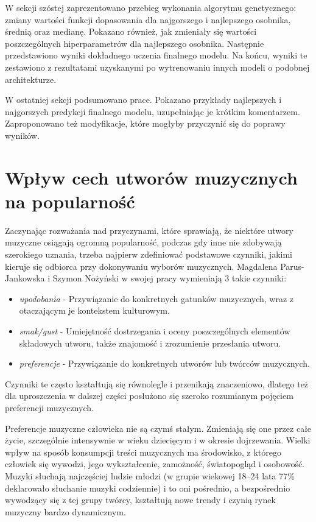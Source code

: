 \documentclass[a4paper,11pt]{article}
\begin{document}
    \bigskip

    W sekcji szóstej zaprezentowano przebieg wykonania algorytmu genetycznego: zmiany wartości funkcji dopasowania dla najgorszego i najlepszego osobnika, średnią oraz medianę. Pokazano również, jak zmieniały się wartości poszczególnych hiperparametrów dla najlepszego osobnika. Następnie przedstawiono wyniki dokładnego uczenia finalnego modelu. Na końcu, wyniki te zestawiono z rezultatami uzyskanymi po wytrenowaniu innych modeli o podobnej architekturze.

    \bigskip

    W ostatniej sekcji podsumowano prace. Pokazano przykłady najlepszych i najgorszych predykcji finalnego modelu, uzupełniając je krótkim komentarzem. Zaproponowano też modyfikacje, które mogłyby przyczynić się do poprawy wyników.

    \newpage


    \section{Wpływ cech utworów muzycznych na popularność}

    Zaczynając rozważania nad przyczynami, które sprawiają, że niektóre utwory muzyczne osiągają ogromną popularność, podczas gdy inne nie zdobywają szerokiego uznania, trzeba najpierw zdefiniować podstawowe czynniki, jakimi kieruje się odbiorca przy dokonywaniu wyborów muzycznych. Magdalena Parus-Jankowska i Szymon Nożyński w swojej pracy\cite{PreferencjeMuzyczneWCzasachSteamingu2020} wymieniają 3 takie czynniki:
    \begin{itemize}
        \item \textit{upodobania} - Przywiązanie do konkretnych gatunków muzycznych, wraz z otaczającym je kontekstem kulturowym.
        \item \textit{smak/gust} - Umiejętność dostrzegania i oceny poszczególnych elementów składowych utworu, także znajomość i zrozumienie przesłania utworu.
        \item \textit{preferencje} - Przywiązanie do konkretnych utworów lub twórców muzycznych.
    \end{itemize}
    \smallskip
    Czynniki te często kształtują się równolegle i przenikają znaczeniowo, dlatego też dla uproszczenia w dalszej części posłużono się szeroko rozumianym pojęciem preferencji muzycznych.

    \bigskip

    Preferencje muzyczne człowieka nie są czymś stałym. Zmieniają się one przez całe życie, szczególnie intensywnie w wieku dziecięcym i w okresie dojrzewania\cite{PreferencjeMuzyczneWCzasachSteamingu2020}. Wielki wpływ na sposób konsumpcji treści muzycznych ma środowisko, z którego człowiek się wywodzi, jego wykształcenie, zamożność, światopogląd i osobowość\cite{PreferencjeMuzyczneWCzasachSteamingu2020}. Muzyki słuchają najczęściej ludzie młodzi (w grupie wiekowej 18--24 lata 77\% deklarowało słuchanie muzyki codziennie\cite{cbos2018}) i to oni pośrednio, a bezpośrednio wywodzący się z tej grupy twórcy, kształtują nowe trendy i czynią rynek muzyczny bardzo dynamicznym.
\end{document}
